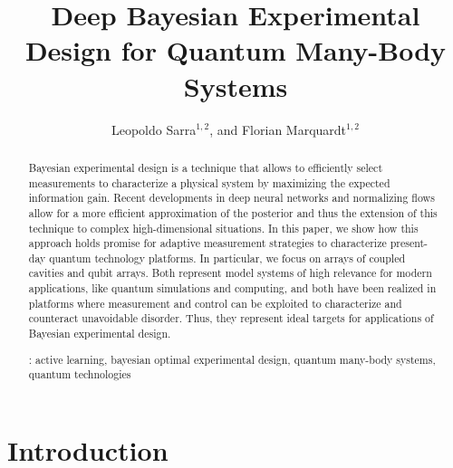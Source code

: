 \documentclass[10pt]{iopart}  %
\begin{document}
\title{Deep Bayesian Experimental Design for Quantum Many-Body Systems}

\author{Leopoldo Sarra$^{1,2}$, and Florian Marquardt$^{1,2}$}
\address{$^1$ Max Planck Institute for the Science of Light, Staudtstraße 2, 91058 Erlangen, Germany}
\address{$^2$ Department of Physics, Friedrich-Alexander Universität Erlangen-Nürnberg, Staudtstraße 5, 91058 Erlangen, Germany}

\begin{abstract}
    Bayesian experimental design is a technique that allows to efficiently select measurements to characterize a physical system by maximizing the expected information gain.
    Recent developments in deep neural networks and normalizing flows allow for a more efficient approximation of the posterior and thus the extension of this technique to complex high-dimensional situations.
    In this paper, we show how this approach holds promise for adaptive measurement strategies to characterize present-day quantum technology platforms.
    In particular, we focus on arrays of coupled cavities and qubit arrays.
    Both represent model systems of high relevance for modern applications, like quantum simulations and computing, and both have been realized in platforms where measurement and control can be exploited to characterize and counteract unavoidable disorder. Thus, they represent ideal targets for applications of Bayesian experimental design.

    \vspace{2pc}
    : active learning, bayesian optimal experimental design, quantum many-body  systems, quantum technologies
    \vspace{2pc}

\end{abstract}



\section{Introduction}
\end{document}
